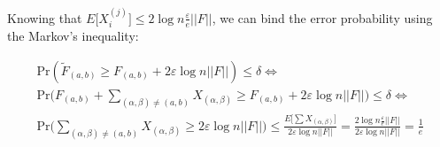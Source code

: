 \documentclass{article}
\begin{document}
\noindent Knowing that $E\big[X_{i}^{(j)}\big] \le 2 \log n \frac{\varepsilon}{e} ||F||$, we can bind the error probability using the Markov's inequality:

\begin{gather*}
    \textrm{Pr}(\tilde{F}_{(a, b)} \ge F_{(a, b)} + 2\varepsilon \log n ||F||) \le \delta \iff \\
    \textrm{Pr}\bigg(F_{(a, b)} + \sum_{(\alpha, \beta) \ne (a, b)}X_{(\alpha, \beta)} \ge F_{(a, b)} + 2 \varepsilon \log n ||F|| \bigg) \le \delta \iff \\
    \textrm{Pr}\bigg(\sum_{(\alpha, \beta) \ne (a, b)}X_{(\alpha, \beta)} \ge 2 \varepsilon \log n ||F||\bigg) \le \frac{E\bigg[\sum X_{(\alpha, \beta)}\bigg]}{2 \varepsilon \log n ||F||} = \frac{2 \log n \frac{\varepsilon}{e} ||F||}{2 \varepsilon \log n ||F||} = \frac{1}{e}
\end{gather*}
\end{document}

